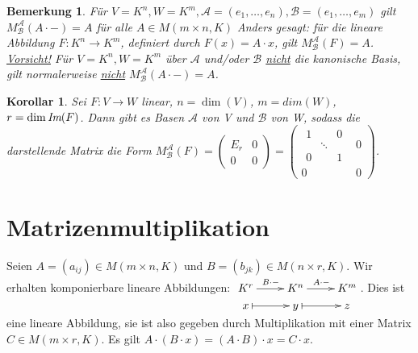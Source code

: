 \documentclass[12pt,a4paper]{article}
\theoremstyle{plain}
\newtheorem{Korollar}[Theorem]{Korollar}
\newtheorem{Bemerkung}[Theorem]{Bemerkung}
\numberwithin{equation}{section}
\begin{document}
\begin{Bemerkung}
Für $V=K^n, W=K^m, \mathcal{A}=(e_1,\ldots,e_n), \mathcal{B}=(e_1,\ldots,e_m)$ gilt $M^\mathcal{A}_\mathcal{B}(A\cdot -)=A$ für alle $A\in M(m\times n, K)$ Anders gesagt: für die lineare Abbildung $F:K^n \rightarrow K^m$, definiert durch $F(x)=A\cdot x$, gilt $M^\mathcal{A}_\mathcal{B}(F)=A$.\\
\underline{Vorsicht!} Für $V=K^n, W=K^m$ über $\mathcal{A}$ und/oder $\mathcal{B}$ \underline{nicht} die kanonische Basis, gilt normalerweise \underline{nicht} $M^\mathcal{A}_\mathcal{B}(A\cdot -)=A$.
\end{Bemerkung}
\begin{Korollar}
Sei $F:V\rightarrow W$ linear, $n=\dim(V)$, $m=dim(W)$, $r=\dim\emph{Im}(F)$. Dann gibt es Basen $\mathcal{A}$ von V und $\mathcal{B}$ von W, sodass die darstellende Matrix die Form $M^\mathcal{A}_\mathcal{B}(F)=\left(\begin{matrix} E_r & 0 \\ 0 & 0 \end{matrix} \right)=\left( \begin{matrix}
\begin{matrix}
1 & & 0\\
& \ddots & \\
0 & & 1 
\end{matrix} & 0 \\ 0 & 0
\end{matrix} \right)$.
\end{Korollar}
\section{Matrizenmultiplikation}
Seien $A=(a_{ij})\in M(m\times n,K)$ und $B=(b_{jk})\in M(n\times r, K)$. Wir erhalten komponierbare lineare Abbildungen: $\begin{xy} \xymatrix@R=0.1cm{ K^r \ar[r]^{B\cdot -} & K^n \ar[r]^{A\cdot -} & K^ m \\ x \ar@{|->}[r] & y \ar@{|->}[r]& z } \end{xy}$. Dies ist eine lineare Abbildung, sie ist also gegeben durch Multiplikation mit einer Matrix $C\in M(m\times r, K)$. Es gilt $A\cdot (B \cdot x)= (A\cdot B)\cdot x= C\cdot x$.
\end{document}

